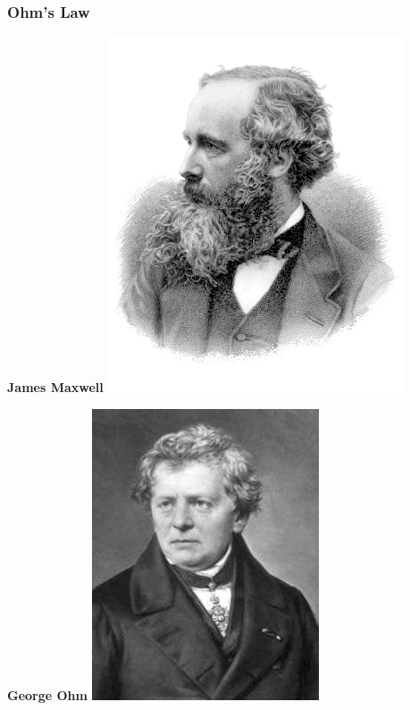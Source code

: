 \documentclass[fleqn]{beamer} %
\newcommand{\sectionIIsubsectionItitle}{Ohm's Law}
\begin{document}
			\begin{frame}[label=sectionIIsubsectionI]
				\frametitle{\sectionIIsubsectionItitle}

				\begin{multicols}{3}

					{\bf James Maxwell}
					\includegraphics[scale=.30]{images/James_Clerk_Maxwell.png} \hspace{3mm}	

					{\bf George Ohm} 
					\includegraphics[scale=.30]{images/George_Ohm.png}	


\end{multicols}
\end{frame}
\end{document}
